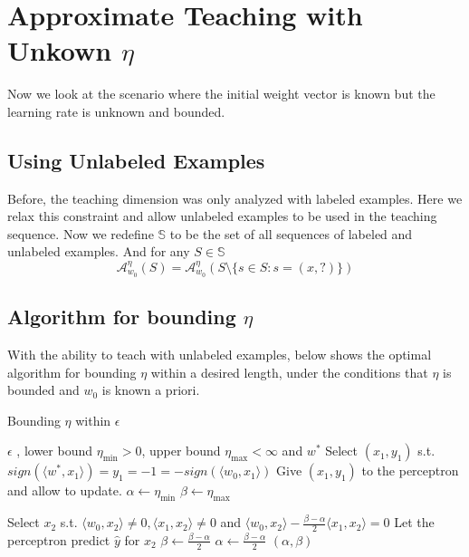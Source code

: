 \documentclass{article}
\newcommand{\learn}{\mathcal{A}_{w_0}^\eta}
\begin{document}
\section{Approximate Teaching with Unkown $\eta$}
Now we look at the scenario where the initial weight vector is known but the learning rate is unknown and bounded.

\subsection{Using Unlabeled Examples}
Before, the teaching dimension was only analyzed with labeled examples. Here we relax this constraint and allow unlabeled examples to be used in the teaching sequence. Now we redefine $\mathbb{S}$ to be the set of all sequences of labeled and unlabeled examples. And for any $S \in \mathbb{S}$
$$
\learn(S) = \learn(S \setminus \{s \in S : s = (x, ?)\} )
$$

\subsection{Algorithm for bounding $\eta$}
With the ability to teach with unlabeled examples, below shows the optimal algorithm for bounding $\eta$ within a desired length, under the conditions that $\eta$ is bounded and $w_0$ is known a priori.

\begin{algorithm}
\caption{Bounding $\eta$ within $\epsilon$ }
\begin{algorithmic}[1]
	\REQUIRE $\epsilon$ , lower bound $\eta_{\min} > 0$, upper bound $\eta_{\max} < \infty$ and $w^*$
	\STATE Select $(x_1 , y_1)$ s.t. $sign(\langle w^* , x_1 \rangle) = y_1 = -1 = 
	-sign(\langle w_0 , x_1 \rangle )$
	\STATE Give $(x_1, y_1)$ to the perceptron and allow to update.
	\STATE $\alpha \leftarrow \eta_{\min}$
	\STATE $\beta \leftarrow \eta_{\max}$
	
	\WHILE{$\beta - \alpha > \epsilon$}
		\STATE Select $ x_2$ s.t. $\langle w_0 , x_2 \rangle \neq 0, \langle x_1 , x_2 \rangle \neq 0$ and $\langle w_0, x_2 \rangle - \frac{\beta - \alpha}{2}\langle x_1, x_2 \rangle = 0$
		\STATE Let the perceptron predict $\hat{y}$ for $x_2$
			\STATE $ \beta \leftarrow \frac{\beta - \alpha}{2}$ 		
		\ELSE
			\STATE $ \alpha \leftarrow \frac{\beta - \alpha}{2}$ 
		\ENDIF	
	\ENDWHILE   
	\RETURN $(\alpha , \beta)$
\end{algorithmic}
\end{algorithm} 
\end{document}
